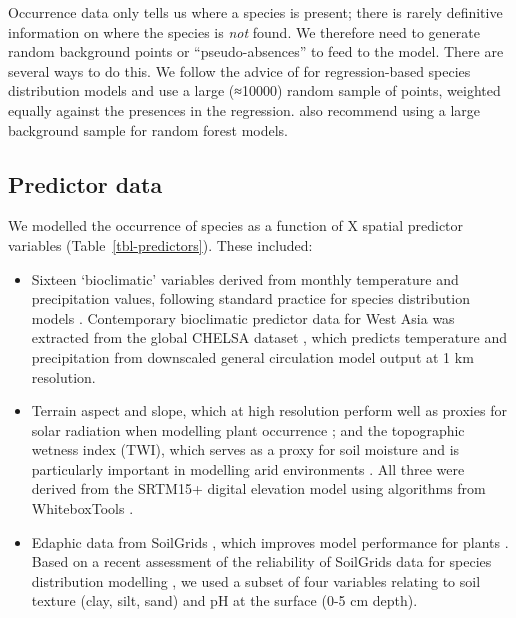\documentclass[
  authoryear,
  preprint]{elsarticle}
\providecommand{\tightlist}{%
  \setlength{\itemsep}{0pt}\setlength{\parskip}{0pt}}\usepackage{longtable,booktabs,array}
\begin{document}
Occurrence data only tells us where a species is present; there is
rarely definitive information on where the species is \emph{not} found.
We therefore need to generate random background points or
``pseudo-absences'' to feed to the model. There are several ways to do
this. We follow the advice of \citet{BarbetMassinEtAl2012} for
regression-based species distribution models and use a large (≈10000)
random sample of points, weighted equally against the presences in the
regression. \citet{ValaviEtAl2022} also recommend using a large
background sample for random forest models.

\subsection{Predictor data}\label{predictor-data}

We modelled the occurrence of species as a function of X spatial
predictor variables (Table~\ref{tbl-predictors}). These included:

\begin{itemize}
\tightlist
\item
  Sixteen `bioclimatic' variables derived from monthly temperature and
  precipitation values, following standard practice for species
  distribution models \citep{HijmansEtAl2005}. Contemporary bioclimatic
  predictor data for West Asia was extracted from the global CHELSA
  dataset \citep{KargerEtAl2017}, which predicts temperature and
  precipitation from downscaled general circulation model output at 1 km
  resolution.
\end{itemize}

\begin{itemize}
\tightlist
\item
  Terrain aspect and slope, which at high resolution perform well as
  proxies for solar radiation when modelling plant occurrence
  \citep{AustinVanNiel2011, LeempoelEtAl2015}; and the topographic
  wetness index (TWI), which serves as a proxy for soil moisture and is
  particularly important in modelling arid environments
  \citep{KopeckyCizkova2010, CamposEtAl2016, DiVirgilioEtAl2018}. All
  three were derived from the SRTM15+ digital elevation model using
  algorithms from WhiteboxTools \citep{Lindsay2016}.
\end{itemize}

\begin{itemize}
\tightlist
\item
  Edaphic data from SoilGrids \citep{HenglEtAl2014, HenglEtAl2017},
  which improves model performance for plants
  \citep{DubuisEtAl2013, ModEtAl2016, VelazcoEtAl2017}. Based on a
  recent assessment of the reliability of SoilGrids data for species
  distribution modelling \citep{MillerEtAl2024}, we used a subset of
  four variables relating to soil texture (clay, silt, sand) and pH at
  the surface (0-5 cm depth).
\end{itemize}
\end{document}
